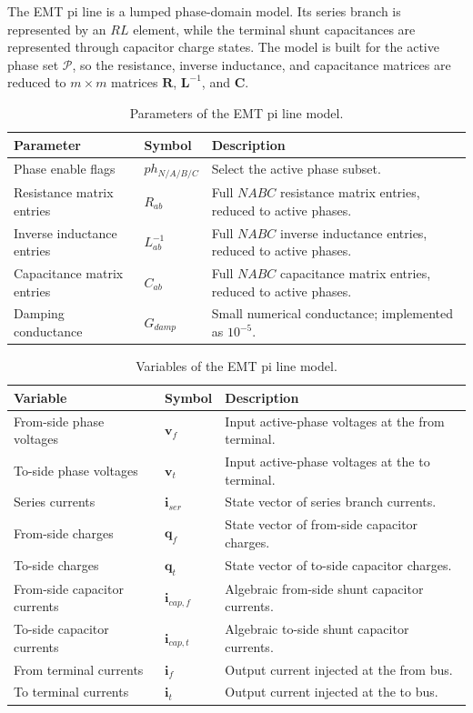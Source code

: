 The EMT pi line is a lumped phase-domain model. Its series branch is represented by an $RL$ element, while the terminal shunt capacitances are represented through capacitor charge states. The model is built for the active phase set $\mathcal{P}$, so the resistance, inverse inductance, and capacitance matrices are reduced to $m \times m$ matrices $\mathbf{R}$, $\mathbf{L}^{-1}$, and $\mathbf{C}$.

\begin{table}[h]
\centering
\begin{tabular}{p{}p{}p{}}
\hline
Parameter & Symbol & Description \\
\hline
Phase enable flags & $ph_{N/A/B/C}$ & Select the active phase subset. \\
Resistance matrix entries & $R_{ab}$ & Full $NABC$ resistance matrix entries, reduced to active phases. \\
Inverse inductance entries & $L^{-1}_{ab}$ & Full $NABC$ inverse inductance entries, reduced to active phases. \\
Capacitance matrix entries & $C_{ab}$ & Full $NABC$ capacitance matrix entries, reduced to active phases. \\
Damping conductance & $G_{damp}$ & Small numerical conductance; implemented as $10^{-5}$. \\
\hline
\end{tabular}
\caption{Parameters of the EMT pi line model.}
\end{table}

\begin{table}[h]
\centering
\begin{tabular}{p{}p{}p{}}
\hline
Variable & Symbol & Description \\
\hline
From-side phase voltages & $\mathbf{v}_f$ & Input active-phase voltages at the from terminal. \\
To-side phase voltages & $\mathbf{v}_t$ & Input active-phase voltages at the to terminal. \\
Series currents & $\mathbf{i}_{ser}$ & State vector of series branch currents. \\
From-side charges & $\mathbf{q}_f$ & State vector of from-side capacitor charges. \\
To-side charges & $\mathbf{q}_t$ & State vector of to-side capacitor charges. \\
From-side capacitor currents & $\mathbf{i}_{cap,f}$ & Algebraic from-side shunt capacitor currents. \\
To-side capacitor currents & $\mathbf{i}_{cap,t}$ & Algebraic to-side shunt capacitor currents. \\
From terminal currents & $\mathbf{i}_f$ & Output current injected at the from bus. \\
To terminal currents & $\mathbf{i}_t$ & Output current injected at the to bus. \\
\hline
\end{tabular}
\caption{Variables of the EMT pi line model.}
\end{table}

